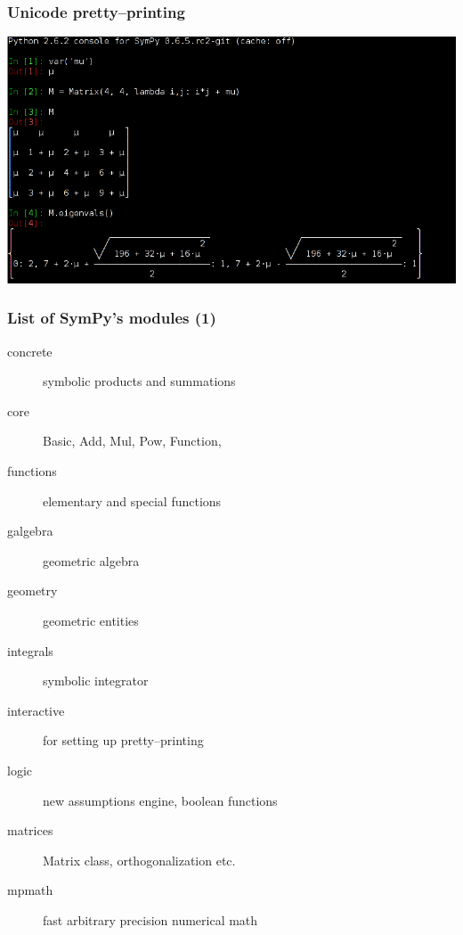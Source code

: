 \documentclass{beamer}
\begin{document}
\begin{frame}[fragile]
    \frametitle{Unicode pretty--printing}

    \begin{center}
        \includegraphics[scale=0.65]{images/sympy-unicode.png}
    \end{center}
\end{frame}


\begin{frame}[fragile]
    \frametitle{List of SymPy's modules (1)}

    \begin{description}
        \item[concrete] symbolic products and summations
        \item[core] Basic, Add, Mul, Pow, Function, \structure{\ldots}
        \item[functions] elementary and special functions
        \item[galgebra] geometric algebra
        \item[geometry] geometric entities
        \item[integrals] symbolic integrator
        \item[interactive] for setting up pretty--printing
        \item[logic] new assumptions engine, boolean functions
        \item[matrices] Matrix class, orthogonalization etc.
        \item[mpmath] fast arbitrary precision numerical math
    \end{description}
\end{frame}
\end{document}
